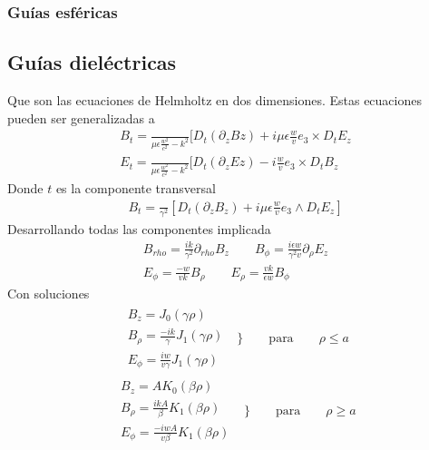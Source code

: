 \subsubsection{Guías esféricas}

\subsection{Guías dieléctricas}
Que son las ecuaciones de Helmholtz en dos dimensiones. Estas ecuaciones pueden ser generalizadas a
\begin{subequations}
	\begin{align}
	B_{t}=\frac{}{\mu \epsilon\frac{w^2}{c^2}-k^2}[D_{t} (\partial_{z} B{z})+i\mu\epsilon\frac{w}{v}e_{3}\times D_{t}E_{z} \\
	E_{t}=\frac{}{\mu \epsilon\frac{w^2}{c^2}-k^2}[D_{t} (\partial_{z} E{z})-i\frac{w}{v}e_{3}\times D_{t}B_{z} 
	\end{align}
	\end{subequations}
Donde $t$ es la componente transversal
\begin{subequations}
	\begin{align}
	B_{t}=\frac{}{\gamma^2} [D_{t}(\partial_{z}B_{z})+i\mu \epsilon \frac{w}{v} e_{3}\wedge D_{t}E_{z}]
	\end{align}
\end{subequations}
Desarrollando todas las componentes implicada
\begin{subequations}
	\begin{align}
B_{rho} = \frac{ik}{\gamma^2}\partial_{rho}B_{z} \qquad B_{\phi} = \frac{i \epsilon w}{\gamma^2 v} \partial_{\rho} E_{z}\\
E_{\phi} = \frac{-w}{v k }B_{\rho} \qquad E_{\rho} = \frac{v k}{\epsilon w} B_{\phi}
	\end{align}
\end{subequations}
Con soluciones 
\begin{eqnarray}
	\begin{array}{ll}
		B_{z} = J_{0}(\gamma \rho) \qquad \nonumber \\
		B_{\rho } = \frac{-i k}{\gamma} J_{1} (\gamma \rho) \nonumber \\
		E_{\phi} = \frac{i w}{v \gamma} J_{1} (\gamma \rho)
		\end{array} \Bigg\} \qquad \text{para}  \qquad \rho \leq a 
\end{eqnarray}
\begin{eqnarray}
\begin{array}{ll}
B_{z} = A K_{0}(\beta \rho) \qquad \nonumber \\
B_{\rho } = \frac{i k A}{\beta} K_{1} (\beta \rho) \nonumber \\
E_{\phi} = \frac{-i w A}{v \beta} K_{1} (\beta \rho)
\end{array} \Bigg\}\qquad \text{para}  \qquad \rho \geq a 
\end{eqnarray}

